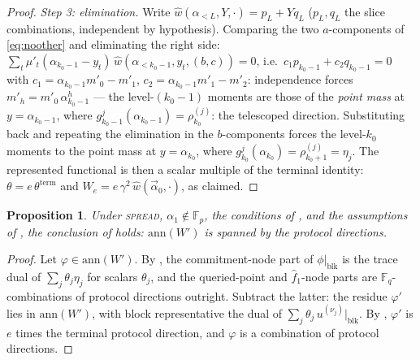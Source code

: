 \documentclass{article}
\newcommand{\Fp}{\mathbb{F}_p}
\newcommand{\Fq}{\mathbb{F}_q}
\newtheorem{proposition}[theorem]{Proposition}
\theoremstyle{definition}
\begin{document}
\begin{proof}
\emph{Step 3: elimination.} Write $\hat{w}(\alpha_{<L}, Y, \cdot) = p_L + Y q_L$ ($p_L, q_L$ the slice combinations, independent by hypothesis). Comparing the two $a$-components of \cref{eq:noother} and eliminating the right side: $\sum_t \mu'_t (\alpha_{k_0-1} - y_t)\, \hat{w}(\alpha_{<k_0-1}, y_t, (b, c)) = 0$, i.e.\ $c_1 p_{k_0-1} + c_2 q_{k_0-1} = 0$ with $c_1 = \alpha_{k_0-1} m'_0 - m'_1$, $c_2 = \alpha_{k_0-1} m'_1 - m'_2$: independence forces $m'_h = m'_0\, \alpha_{k_0-1}^h$ --- the level-$(k_0{-}1)$ moments are those of the \emph{point mass} at $y = \alpha_{k_0-1}$, where $g^j_{k_0-1}(\alpha_{k_0-1}) = \rho^{(j)}_{k_0}$: the telescoped direction. Substituting back and repeating the elimination in the $b$-components forces the level-$k_0$ moments to the point mass at $y = \alpha_{k_0}$, where $g^j_{k_0}(\alpha_{k_0}) = \rho^{(j)}_{k_0+1} = \eta_j$. The represented functional is then a scalar multiple of the terminal identity: $\theta = e\, \theta^{\mathrm{term}}$ and $W_e = e\, \gamma^2\, \hat{w}(\vec{\alpha}_0, \cdot)$, as claimed.
\end{proof}

\begin{proposition}\label{prop:pinbound}
Under \textsc{spread}, $\alpha_1 \notin \Fp$, the conditions of , and the assumptions of , the conclusion of  holds: $\mathrm{ann}(W')$ is spanned by the protocol directions.
\end{proposition}

\begin{proof}
Let $\varphi \in \mathrm{ann}(W')$. By , the commitment-node part of $\phi|_{\mathrm{blk}}$ is the trace dual of $\sum_j \theta_j \eta_j$ for scalars $\theta_j$, and the queried-point and $\hat{f}_1$-node parts are $\Fq$-combinations of protocol directions outright. Subtract the latter: the residue $\varphi'$ lies in $\mathrm{ann}(W')$, with block representative the dual of $\sum_j \theta_j\, u^{(\nu_j)}|_{\mathrm{blk}}$. By , $\varphi'$ is $e$ times the terminal protocol direction, and $\varphi$ is a combination of protocol directions.
\end{proof}
\end{document}
